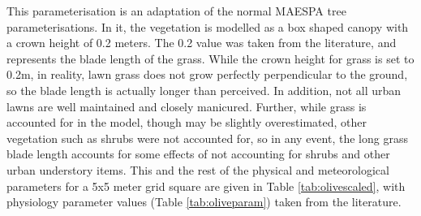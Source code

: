 \documentclass[final,3p,times,authoryear]{elsarticle}
\begin{document}
This parameterisation is an adaptation of the normal MAESPA tree parameterisations. In it, the vegetation is modelled as a box shaped canopy with a crown height of 0.2 meters. The 0.2 value was taken from the literature, and represents the blade length of the grass. While the crown height for grass is set to 0.2m, in reality, lawn grass does not grow perfectly perpendicular to the ground, so the blade length is actually longer than perceived. In addition, not all urban lawns are well maintained and closely manicured. Further, while grass is accounted for in the model, though may be slightly overestimated, other vegetation such as shrubs were not accounted for, so in any event, the long grass blade length accounts for some effects of not accounting for shrubs and other urban understory items. This and the rest of the physical and meteorological parameters for a 5x5 meter grid square are given in Table \ref{tab:olivescaled}, with physiology parameter values (Table \ref{tab:oliveparam}) taken from the literature.
\end{document}
